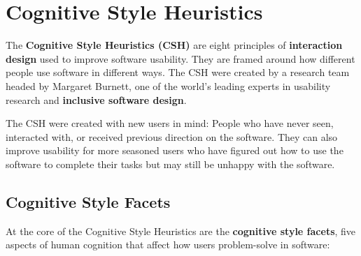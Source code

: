 \yesmargins
\chapter{Cognitive Style Heuristics}
\marginpar{\cognitiveStyleHeuristicsDef\margindivider}\marginpar{\interactionDesignDef}The \textbf{Cognitive Style Heuristics (CSH)} are eight principles of \textbf{interaction design} used to improve software usability. They are framed around how different people use software in different ways. The CSH were created by a research team headed by Margaret Burnett, one of the world's leading experts in usability research and \textbf{inclusive software design}.

The CSH were created with new users in mind: People who have never seen, interacted with, or received previous direction on the software. They can also improve usability for more seasoned users who have figured out how to use the software to complete their tasks but may still be unhappy with the software.

\section{Cognitive Style Facets}\marginpar{\inclusiveSoftwareDesignDef\margindivider}\marginpar{\cognitiveStyleFacetsDef\margindivider}\marginpar{\motivationCsfDef\margindivider}\marginpar{\informationProcessingStyleCsfDef\margindivider}\marginpar{\computerSelfEfficacyCsfDef}

At the core of the Cognitive Style Heuristics are the \textbf{cognitive style facets}, five aspects of human cognition that affect how users problem-solve in software:

